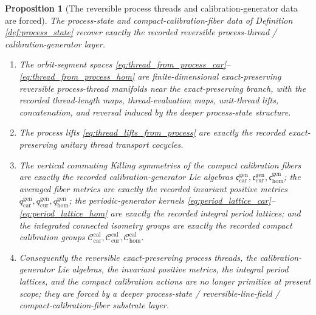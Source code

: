 \documentclass[11pt]{article}
\newcommand{\TensorCalGroup}{\mathcal C_{\mathrm{car}}^{\mathrm{cal}}}
\newcommand{\CurCalGroup}{\mathcal C_{\mathrm{cur}}^{\mathrm{cal}}}
\newcommand{\HomCalGroup}{\mathcal C_{\mathrm{hom}}^{\mathrm{cal}}}
\newcommand{\TensorCalLie}{\mathfrak c_{\mathrm{car}}^{\mathrm{gen}}}
\newcommand{\CurCalLie}{\mathfrak c_{\mathrm{cur}}^{\mathrm{gen}}}
\newcommand{\HomCalLie}{\mathfrak c_{\mathrm{hom}}^{\mathrm{gen}}}
\newcommand{\TensorCalMetric}{q_{\mathrm{car}}^{\mathrm{gen}}}
\newcommand{\CurCalMetric}{q_{\mathrm{cur}}^{\mathrm{gen}}}
\newcommand{\HomCalMetric}{q_{\mathrm{hom}}^{\mathrm{gen}}}
\newtheorem{proposition}{Proposition}
\begin{document}
\begin{proposition}[The reversible process threads and calibration-generator data are forced]
\label{prop:threads_forced}
The process-state and compact-calibration-fiber data of Definition \ref{def:process_state} recover exactly the recorded reversible process-thread / calibration-generator layer.
\begin{enumerate}
    \item The orbit-segment spaces \eqref{eq:thread_from_process_car}--\eqref{eq:thread_from_process_hom} are finite-dimensional exact-preserving reversible process-thread manifolds near the exact-preserving branch, with the recorded thread-length maps, thread-evaluation maps, unit-thread lifts, concatenation, and reversal induced by the deeper process-state structure.
    \item The process lifts \eqref{eq:thread_lifts_from_process} are exactly the recorded exact-preserving unitary thread transport cocycles.
    \item The vertical commuting Killing symmetries of the compact calibration fibers are exactly the recorded calibration-generator Lie algebras \(\TensorCalLie,\CurCalLie,\HomCalLie\); the averaged fiber metrics are exactly the recorded invariant positive metrics \(\TensorCalMetric,\CurCalMetric,\HomCalMetric\); the periodic-generator kernels \eqref{eq:period_lattice_car}--\eqref{eq:period_lattice_hom} are exactly the recorded integral period lattices; and the integrated connected isometry groups are exactly the recorded compact calibration groups \(\TensorCalGroup,\CurCalGroup,\HomCalGroup\).
    \item Consequently the reversible exact-preserving process threads, the calibration-generator Lie algebras, the invariant positive metrics, the integral period lattices, and the compact calibration actions are no longer primitive at present scope; they are forced by a deeper process-state / reversible-line-field / compact-calibration-fiber substrate layer.
\end{enumerate}
\end{proposition}
\end{document}

